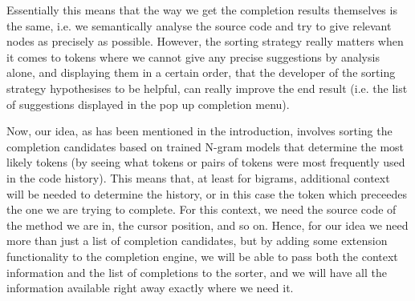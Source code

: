 Essentially this means that the way we get the completion results themselves is the same, i.e. we semantically analyse the source code and try to give relevant nodes as precisely as possible. However, the sorting strategy really matters when it comes to tokens where we cannot give any precise suggestions by analysis alone, and displaying them in a certain order, that the developer of the sorting strategy hypothesises to be helpful, can really improve the end result (i.e. the list of suggestions displayed in the pop up completion menu).

Now, our idea, as has been mentioned in the introduction, involves sorting the completion candidates based on trained N-gram models that determine the most likely tokens (by seeing what tokens or pairs of tokens were most frequently used in the code history). This means that, at least for bigrams, additional context will be needed to determine the history, or in this case the token which preceedes the one we are trying to complete. For this context, we need the source code of the method we are in, the cursor position, and so on. Hence, for our idea we need more than just a list of completion candidates, but by adding some extension functionality to the completion engine, we will be able to pass both the context information and the list of completions to the sorter, and we will have all the information available right away exactly where we need it.
